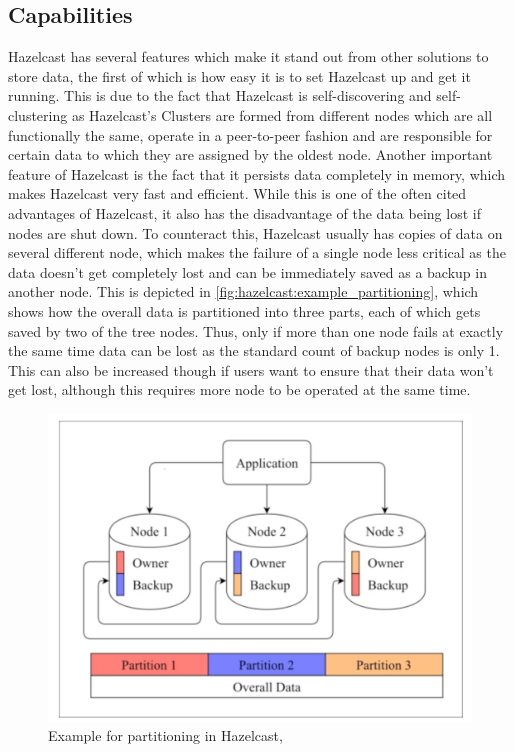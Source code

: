 \subsection{Capabilities} \label{subsec:capabilitiesHazelcast}
Hazelcast has several features which make it stand out from other solutions to store data, the first of which is how easy it is 
to set Hazelcast up and get it running. This is due to the fact that Hazelcast is self-discovering and self-clustering as Hazelcast's 
Clusters are formed from different nodes which are all functionally the same, operate in a peer-to-peer fashion and are responsible for 
certain data to which they are assigned by the oldest node. \cite{Johns.2015} \newline
Another important feature of Hazelcast is the fact that it persists data completely in memory, which makes Hazelcast very fast and efficient.
While this is one of the often cited advantages of Hazelcast, it also has the disadvantage of the data being lost if nodes are shut down. To counteract this, Hazelcast usually has copies of data on several different node, which makes the failure of a single node less critical as the data doesn't get completely lost and can be immediately saved as a backup 
in another node. This is depicted in \autoref{fig:hazelcast:example_partitioning}, which shows how the overall data is partitioned into three parts, each of which gets saved by two of the tree nodes. Thus, only if more than 
one node fails at exactly the same time data can be lost as the standard count of backup nodes is only 1. This can also be increased though if users want to 
ensure that their data won't get lost, although this requires more node to be operated at the same time. \cite{Johns.2015} \newline

\begin{figure}[H]
    \centering
    \includegraphics[width=16cm]{images/hazelcast_partitioning.png}
    \caption[Example for partitioning in Hazelcast]{Example for partitioning in Hazelcast, \cite{Johns.2015}}
    \label{fig:hazelcast:example_partitioning}
\end{figure}

